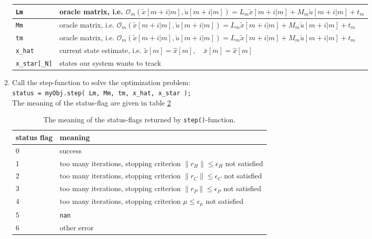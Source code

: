 \documentclass[letter]{article}
\begin{document}
\begin{sffamily}
\begin{enumerate}
\begin{table}[!htdp]
\begin{center}
\begin{tabular}{|l|l|}
		 \texttt{Lm} & oracle matrix, i.e. $\mathcal{O}_m(\tilde{x}[m+i|m],\check{u}[m+i|m]) = L_m \tilde{x}[m+i|m] + M_m \check{u}[m+i|m] + t_m$ 					 \\ \hline
 		\texttt{Mm} & oracle matrix, i.e. $\mathcal{O}_m(\tilde{x}[m+i|m],\check{u}[m+i|m]) = L_m \tilde{x}[m+i|m] + M_m \check{u}[m+i|m] + t_m$ 					 \\ \hline
 		\texttt{tm} & oracle matrix, i.e. $\mathcal{O}_m(\tilde{x}[m+i|m],\check{u}[m+i|m]) = L_m \tilde{x}[m+i|m] + M_m \check{u}[m+i|m] + t_m$				\\ \hline
 		\texttt{x\_hat} & current state estimate, i.e. $\tilde{x}[m] = \hat{x}[m],\quad \bar{x}[m] = \hat{x}[m]$ \\ \hline
 		\texttt{x\_star[\_N]} & states our system wants to track \\ \hline
	\end{tabular}
	\end{center}
	\label{tab: oracleParameters}
	\end{table}	
	
	\item Call the step-function to solve the optimization problem: \\
	\texttt{status = myObj.step( Lm, Mm, tm, x\_hat, x\_star );} \\
	The meaning of the status-flag are given in table \ref{tab: error code}
	
	\begin{table}[!htdp]
	\caption{The meaning of the status-flags returned by \texttt{step()}-function.}
	\begin{center}
	\begin{tabular}{|l|l|}\hline
	{
	 \bf status flag} & meaning  \\ \hline\hline
	 0 & success \\
	 1 & too many iterations, stopping criterion $\|r_H\| \leq \epsilon_H$ not satisfied\\
	 2 & too many iterations, stopping criterion $\|r_C\| \leq \epsilon_C$ not satisfied \\
	 3 & too many iterations, stopping criterion $\|r_P\| \leq \epsilon_P$ not satisfied \\
	 4 & too many iterations, stopping criterion $\mu \leq \epsilon_\mu$ not satisfied \\
	 5 & \texttt{nan} \\
	 6 & other error \\ \hline
	\end{tabular}
	\end{center}
	\label{tab: error code}
	\end{table}
	

\end{enumerate}
\end{sffamily}
\end{document}
